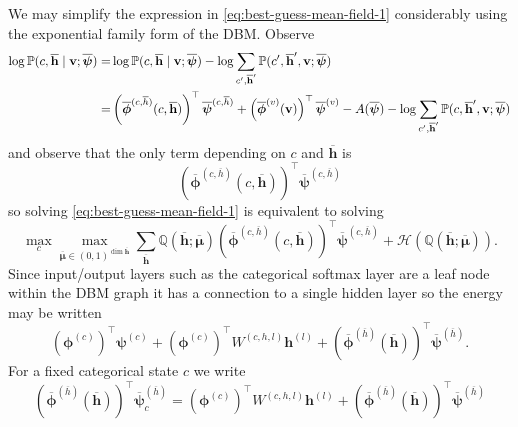 \documentclass{article} %
\begin{document}
We may simplify the expression in \autoref{eq:best-guess-mean-field-1} considerably using the exponential family form of the DBM.
Observe
\begin{align}
\log \mathbb{P}(c,\overline{\mathbf{h}}\mid \mathbf{v};\overline{\boldsymbol{\psi}}) =& 
\log \mathbb{P}(c,\overline{\mathbf{h}}\mid \mathbf{v};\overline{\boldsymbol{\psi}}) 
- \log \sum_{c',\overline{\mathbf{h}}'}\mathbb{P}(c',\overline{\mathbf{h}}',\mathbf{v};\overline{\boldsymbol{\psi}})\notag\\
=& \left(\overline{\boldsymbol{\phi}}^{(c,\overline{h})}(c,\overline{\mathbf{h}})\right)^\top \overline{\boldsymbol{\psi}}^{(c,\overline{h})} 
+ \left(\overline{\boldsymbol{\phi}}^{(v)}(\mathbf{v})\right)^\top \overline{\boldsymbol{\psi}}^{(v)} - A(\overline{\boldsymbol{\psi}})
-\log \sum_{c',\overline{\mathbf{h}}'}\mathbb{P}(c,\overline{\mathbf{h}}',\mathbf{v};\overline{\boldsymbol{\psi}})
\end{align}
and observe that the only term depending on $c$ and $\overline{\mathbf{h}}$ is
\begin{equation}
\left(\overline{\boldsymbol{\phi}}^{(c,\overline{h})}(c,\overline{\mathbf{h}})\right)^\top \overline{\boldsymbol{\psi}}^{(c,\overline{h})}
\end{equation}
so solving \autoref{eq:best-guess-mean-field-1} is equivalent to solving
\begin{equation}\label{eq:best-guess-mean-field-2}
\max_c \max_{\overline{\boldsymbol{\mu}}\in (0,1)^{\dim \overline{\mathbf{h}}}} \sum_{\overline{\mathbf{h}}} \mathbb{Q}(\overline{\mathbf{h}};\overline{\boldsymbol{\mu}})
\left(\overline{\boldsymbol{\phi}}^{(c,\overline{h})}(c,\overline{\mathbf{h}})\right)^\top \overline{\boldsymbol{\psi}}^{(c,\overline{h})} + \mathcal{H}(\mathbb{Q}(\overline{\mathbf{h}};\overline{\boldsymbol{\mu}})).
\end{equation}
Since input/output layers such as the categorical softmax layer are a
leaf node within the DBM graph it has a connection to a single hidden layer so the 
energy may be written
\begin{equation}
\left(\boldsymbol{\phi}^{(c)}\right)^\top \boldsymbol{\psi}^{(c)} + \left(\boldsymbol{\phi}^{(c)}\right)^\top W^{(c,h,l)} \mathbf{h}^{(l)} +   \left(\overline{\boldsymbol{\phi}}^{(\overline{h})}(\overline{\mathbf{h}})\right)^\top \overline{\boldsymbol{\psi}}^{(\overline{h})}.
\end{equation}
For a fixed categorical state $c$ we write
\begin{equation}
\left(\overline{\boldsymbol{\phi}}^{(\overline{h})}(\overline{\mathbf{h}})\right)^\top \overline{\boldsymbol{\psi}}^{(\overline{h})}_c = \left(\boldsymbol{\phi}^{(c)}\right)^\top W^{(c,h,l)} \mathbf{h}^{(l)} +   \left(\overline{\boldsymbol{\phi}}^{(\overline{h})}(\overline{\mathbf{h}})\right)^\top \overline{\boldsymbol{\psi}}^{(\overline{h})}
\end{equation}
\end{document}
